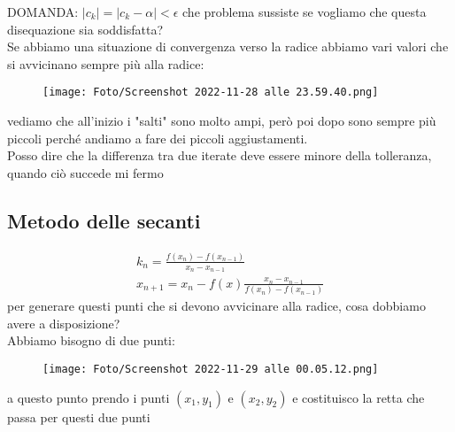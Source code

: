 \documentclass[a4paper, portrait]{book}
\numberwithin{equation}{chapter} %
\begin{document}
DOMANDA: $|c_k| = |c_k - \alpha| < \epsilon$ che problema sussiste se vogliamo che questa disequazione sia soddisfatta?\\
Se abbiamo una situazione di convergenza verso la radice abbiamo vari valori che si avvicinano sempre più alla radice:
\begin{figure}[h!]
    \centering
    \texttt{[image: Foto/Screenshot 2022-11-28 alle 23.59.40.png]}
    \caption{}
\end{figure}
vediamo che all'inizio i "salti" sono molto ampi, però poi dopo sono sempre più piccoli perché andiamo a fare dei piccoli aggiustamenti.\\
Posso dire che la differenza tra due iterate deve essere minore della tolleranza, quando ciò succede mi fermo
\subsection*{Metodo delle secanti}
\begin{gather}
    k_n = \frac{f(x_n) - f(x_{n-1})}{x_n - x_{n-1}}\\
    x_{n+1} = x_n - f(x) \frac{x_n - x_{n-1}}{f(x_n) - f(x_{n-1})}
\end{gather}
per generare questi punti che si devono avvicinare alla radice, cosa dobbiamo avere a disposizione?\\
Abbiamo bisogno di due punti:
\begin{figure}[h!]
    \centering
    \texttt{[image: Foto/Screenshot 2022-11-29 alle 00.05.12.png]}
    \caption{}
\end{figure}
a questo punto prendo i punti $(x_1, y_1)$ e $(x_2, y_2)$ e costituisco la retta che passa per questi due punti
\end{document}
